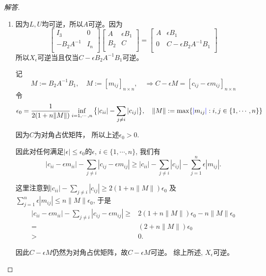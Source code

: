 \documentclass[UTF8]{ctexart}
\begin{document}
\begin{proof}[解答]
\begin{enumerate}
\item
因为$L,U$均可逆，所以$A$可逆。因为
\[
\begin{bmatrix}
I_3& 0\\
 -B_2 A^{-1}&I_n\\
\end{bmatrix} \begin{bmatrix}
A& \epsilon B_1\\
 B_2 &C\\
\end{bmatrix} = \begin{bmatrix}
A& \epsilon B_1\\
0 &C-\epsilon B_2 A^{-1}B_1\\
\end{bmatrix}
\]
所以$X_{\epsilon}$可逆当且仅当$C-\epsilon B_2 A^{-1}B_1$可逆。

记
\[
M:=B_2A^{-1}B_1, \quad M:=[m_{ij}]_{n\times n},\quad \Longrightarrow C-\epsilon M=[c_{ij}-\epsilon m_{ij}]_{n\times n}
\]
令
\[
\epsilon_{0}= \frac{1}{2(1+n\|M\|)}\inf_{i=1,\cdots, n} \big\{|c_{ii}|-\sum_{j\neq i} |c_{ij}|\big\}, \quad \| M\|:=\max\{{\color{blue}\mid}m_{ij}{\color{blue}\mid}:i,j\in\{1,\cdots, n\}\}
\]

因为$C$为对角占优矩阵，
所以上述$\epsilon_0>0$.%


因此对任何满足$ |\epsilon|\leq \epsilon_0$的$\epsilon$, $i\in\{1,\cdots, n\}$, 我们有
\[
|c_{ii}-\epsilon m_{ii}|-\sum_{j\neq i} |c_{ij}-\epsilon m_{ij}| \geq |c_{ii}|-\sum_{j\neq i} |c_{ij}|- \sum_{j=1}^n \epsilon |m_{ij}|.
\]

这里注意到$|c_{ii}|-\sum_{j\neq i} |c_{ij}| \geq 2(1+n\|M\|)\epsilon_0$ 及 $\sum_{j=1}^n \epsilon |m_{ij}|\leq n\|M\|\epsilon_0$, 于是
\begin{align*}
    |c_{ii}-\epsilon m_{ii}|-\sum_{j\neq i} |c_{ij}-\epsilon m_{ij}|\geq &2(1+n\|M\|)\epsilon_0-n\|M\|\epsilon_0\\
    =&(2+n\|M\|)\epsilon_0\\
    >&0.
\end{align*}


因此$C-\epsilon M$仍然为对角占优矩阵，故$C-\epsilon M$可逆。 综上所述, $X_\epsilon$可逆。
\end{enumerate}
\end{proof}

\clearpage
\listofchanges
\end{document}
